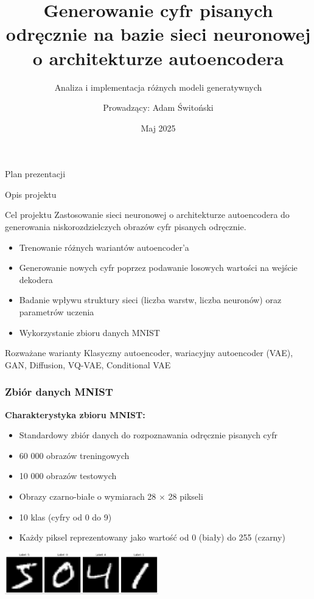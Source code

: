 \documentclass{beamer}
\title{Generowanie cyfr pisanych odręcznie na bazie sieci neuronowej o architekturze autoencodera}
\subtitle{Analiza i implementacja różnych modeli generatywnych}
\author{Prowadzący: Adam Świtoński}
\institute{Politechnika Śląska}
\date{Maj 2025}
\begin{document}
\begin{frame}
  \titlepage
\end{frame}

\begin{frame}{Plan prezentacji}
  \tableofcontents
\end{frame}

\begin{frame}{Opis projektu}
  \begin{block}{Cel projektu}
    Zastosowanie sieci neuronowej o architekturze autoencodera do generowania niskorozdzielczych obrazów cyfr pisanych odręcznie.
  \end{block}
  
  \begin{itemize}
    \item Trenowanie różnych wariantów autoencoder'a
    \item Generowanie nowych cyfr poprzez podawanie losowych wartości na wejście dekodera
    \item Badanie wpływu struktury sieci (liczba warstw, liczba neuronów) oraz parametrów uczenia
    \item Wykorzystanie zbioru danych MNIST
  \end{itemize}
  
  \begin{block}{Rozważane warianty}
    Klasyczny autoencoder, wariacyjny autoencoder (VAE), GAN, Diffusion, VQ-VAE, Conditional VAE
  \end{block}
\end{frame}

\begin{frame}
  \frametitle{Zbiór danych MNIST}
  
  \textbf{Charakterystyka zbioru MNIST:}
  \begin{itemize}
      \item Standardowy zbiór danych do rozpoznawania odręcznie pisanych cyfr
      \item 60 000 obrazów treningowych
      \item 10 000 obrazów testowych
      \item Obrazy czarno-białe o wymiarach 28 $\times$ 28 pikseli
      \item 10 klas (cyfry od 0 do 9)
      \item Każdy piksel reprezentowany jako wartość od 0 (biały) do 255 (czarny)
  \end{itemize}

  \vspace{0.5cm}
  \begin{center}
    \includegraphics[width=0.5\textwidth]{img/mnist_example.png}\\
  \end{center}
\end{frame}
\end{document}

